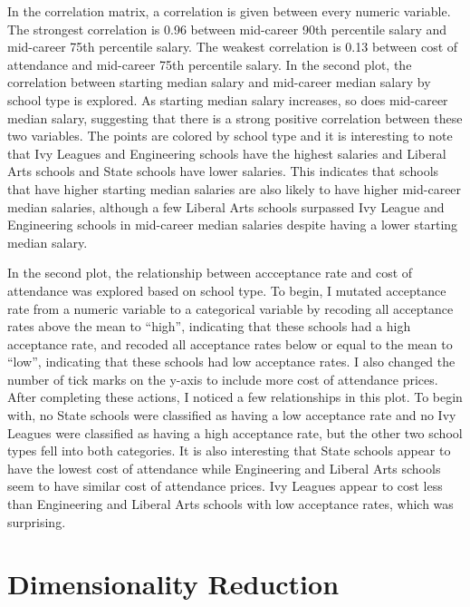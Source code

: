 \documentclass[]{article}
\begin{document}
In the correlation matrix, a correlation is given between every numeric
variable. The strongest correlation is 0.96 between mid-career 90th
percentile salary and mid-career 75th percentile salary. The weakest
correlation is 0.13 between cost of attendance and mid-career 75th
percentile salary. In the second plot, the correlation between starting
median salary and mid-career median salary by school type is explored.
As starting median salary increases, so does mid-career median salary,
suggesting that there is a strong positive correlation between these two
variables. The points are colored by school type and it is interesting
to note that Ivy Leagues and Engineering schools have the highest
salaries and Liberal Arts schools and State schools have lower salaries.
This indicates that schools that have higher starting median salaries
are also likely to have higher mid-career median salaries, although a
few Liberal Arts schools surpassed Ivy League and Engineering schools in
mid-career median salaries despite having a lower starting median
salary.

In the second plot, the relationship between accceptance rate and cost
of attendance was explored based on school type. To begin, I mutated
acceptance rate from a numeric variable to a categorical variable by
recoding all acceptance rates above the mean to ``high'', indicating
that these schools had a high acceptance rate, and recoded all
acceptance rates below or equal to the mean to ``low'', indicating that
these schools had low acceptance rates. I also changed the number of
tick marks on the y-axis to include more cost of attendance prices.
After completing these actions, I noticed a few relationships in this
plot. To begin with, no State schools were classified as having a low
acceptance rate and no Ivy Leagues were classified as having a high
acceptance rate, but the other two school types fell into both
categories. It is also interesting that State schools appear to have the
lowest cost of attendance while Engineering and Liberal Arts schools
seem to have similar cost of attendance prices. Ivy Leagues appear to
cost less than Engineering and Liberal Arts schools with low acceptance
rates, which was surprising.

\section{Dimensionality Reduction}\label{dimensionality-reduction}
\end{document}
